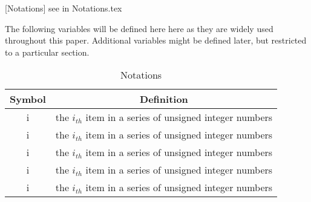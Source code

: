 [Notations] see in Notations.tex

The following variables will be defined here here as they are widely used throughout this paper. Additional variables might be defined later, but restricted to a particular section.

\begin{table}[H]
	\centering
	\begin{tabular}{|c|c|}
		\hline
		\rowcolor[HTML]{656565} 
		{\color[HTML]{FFFFFF} \textbf{Symbol}} & {\color[HTML]{FFFFFF} \textbf{Definition}} \\ \hline
		i    & the $i_{th}$ item in a series of unsigned integer numbers  \\ \hline
		i    & the $i_{th}$ item in a series of unsigned integer numbers  \\ \hline
		i    & the $i_{th}$ item in a series of unsigned integer numbers  \\ \hline
		i    & the $i_{th}$ item in a series of unsigned integer numbers  \\ \hline
		i    & the $i_{th}$ item in a series of unsigned integer numbers  \\ \hline
	\end{tabular}
	\caption{Notations}
\end{table}